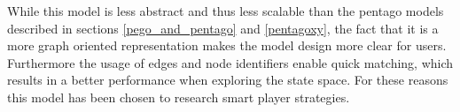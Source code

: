 \vspace{6pt}

While this model is less abstract and thus less scalable than the pentago models described in sections \ref{pego_and_pentago} and \ref{pentagoxy}, the fact that it is a more graph oriented representation makes the model design more clear for users.
Furthermore the usage of edges and node identifiers enable quick matching, which results in a better performance when exploring the state space.
For these reasons this model has been chosen to research smart player strategies.